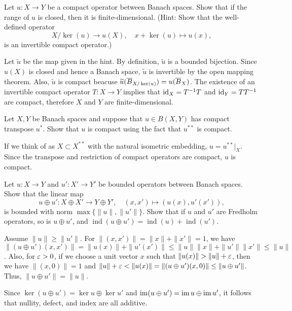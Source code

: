 \documentclass{../solution}
\DeclareMathOperator{\ind}{ind}
\begin{document}
\begin{prb}
Let $u:X\to Y$ be a compact operator between Banach spaces.
Show that if the range of $u$ is closed, then it is finite-dimensional.
(Hint: Show that the well-defined operator
\[X/\ker(u)\to u(X),\quad x+\ker(u)\mapsto u(x),\]
is an invertible compact operator.)
\end{prb}
\begin{sol}
Let $\tilde u$ be the map given in the hint.
By definition, $\tilde u$ is a bounded bijection.
Since $u(X)$ is closed and hence a Banach space, $\tilde u$ is invertible by the open mapping theorem.
Also, $\tilde u$ is compact beacuse $\widetilde u(\overline B_{X/\ker(u)})=u(\overline B_X)$.
The existence of an invertible compact operator $T:X\to Y$ implies that $\operatorname{id}_X=T^{-1}T$ and $\operatorname{id}_Y=TT^{-1}$ are compact, therefore $X$ and $Y$ are finite-dimensional.
\end{sol}


\begin{prb}
Let $X,Y$ be Banach spaces and suppose that $u\in B(X,Y)$ has compact transpose $u^*$.
Show that $u$ is compact using the fact that $u^{**}$ is compact.
\end{prb}
\begin{sol}
If we think of as $X\subset X^{**}$ with the natural isometric embedding, $u=u^{**}|_X$.
Since the transpose and restriction of compact operators are compact, $u$ is compact.
\end{sol}


\begin{prb}
Let $u:X\to Y$ and $u':X'\to Y'$ be bounded operators between Banach spaces.
Show that the linear map
\[u\oplus u':X\oplus X'\to Y\oplus Y',\quad(x,x')\mapsto(u(x), u'(x')),\]
is bounded with norm $\max\{\|u\|,\|u'\|\}$.
Show that if $u$ and $u'$ are Fredholm operators, so is $u\oplus u'$, and $\ind(u\oplus u')=\ind(u)+\ind(u')$.
\end{prb}
\begin{sol}
Assume $\|u\|\ge\|u'\|$.
For $\|(x,x')\|=\|x\|+\|x'\|=1$, we have $\|(u\oplus u')(x,x')\|=\|u(x)\|+\|u'(x')\|\le\|u\|\|x\|+\|u'\|\|x'\|\le\|u\|$.
Also, for $\varepsilon>0$, if we choose a unit vector $x$ such that $\|u(x)\|>\|u\|+\e$, then we have $\|(x,0)\|=1$ and $\|u\|+\varepsilon<\|u(x)\|=\|(u\oplus u')(x,0)\|\le\|u\oplus u'\|$.
Thus, $\|u\oplus u'\|=\|u\|$.

Since $\ker(u\oplus u')=\ker u\oplus\ker u'$ and $\operatorname{im}(u\oplus u')=\operatorname{im} u\oplus\operatorname{im} u'$, it follows that nullity, defect, and index are all additive.
\end{sol}
\end{document}
